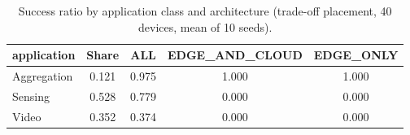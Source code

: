 \begin{table}[t]
\centering
\footnotesize
\caption{Success ratio by application class and architecture (trade-off placement, 40 devices, mean of 10 seeds).}
\label{tab:p1-classes}
\begin{tabular}{lcccc}
\toprule
application & Share & ALL & EDGE\_AND\_CLOUD & EDGE\_ONLY \\
\midrule
Aggregation & 0.121 & 0.975 & 1.000 & 1.000 \\
Sensing & 0.528 & 0.779 & 0.000 & 0.000 \\
Video & 0.352 & 0.374 & 0.000 & 0.000 \\
\bottomrule
\end{tabular}
\par\vspace{2pt}{\footnotesize\raggedright Share is the class's fraction of generated requests. A class with zero success cannot be rescued by adding devices: it is infeasible against its own deadline on every eligible tier.\par}
\end{table}
